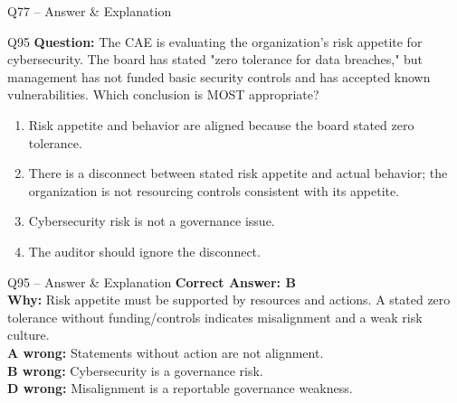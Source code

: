 \documentclass[aspectratio=169,10pt]{beamer}
\begin{document}
\begin{frame}[t]{Q77 -- Answer \& Explanation}
	\begin{frame}[t]{Q95}
		\small
		\textbf{Question:} The CAE is evaluating the organization's risk appetite for cybersecurity. The board has stated "zero tolerance for data breaches," but management has not funded basic security controls and has accepted known vulnerabilities. Which conclusion is MOST appropriate?
		\begin{enumerate}[label=\Alph*.,itemsep=1pt,topsep=2pt]
			\item Risk appetite and behavior are aligned because the board stated zero tolerance.
			\item There is a disconnect between stated risk appetite and actual behavior; the organization is not resourcing controls consistent with its appetite.
			\item Cybersecurity risk is not a governance issue.
			\item The auditor should ignore the disconnect.
		\end{enumerate}
	\end{frame}
	
	\begin{frame}[t]{Q95 -- Answer \& Explanation}
		\small
		\textbf{Correct Answer: B} \\[4pt]
		\textbf{Why:} Risk appetite must be supported by resources and actions. A stated zero tolerance without funding/controls indicates misalignment and a weak risk culture. \\[4pt]
		\textbf{A wrong:} Statements without action are not alignment. \\[2pt]
		\textbf{B wrong:} Cybersecurity is a governance risk. \\[2pt]
		\textbf{D wrong:} Misalignment is a reportable governance weakness.
	\end{frame}
	

\end{frame}
\end{document}
